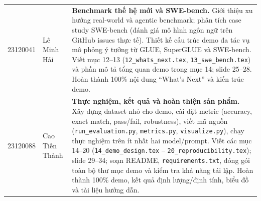 \begin{longtable}{p{2.2cm} p{3.6cm} p{10.2cm}}
23120041 & Lê Minh Hải &
\textbf{Benchmark thế hệ mới và SWE-bench.}
Giới thiệu xu hướng real‑world và agentic benchmark; phân tích case study SWE-bench (đánh giá mô hình ngôn ngữ trên GitHub issues thực tế).
Thiết kế cấu trúc demo đa tác vụ mô phỏng ý tưởng từ GLUE, SuperGLUE và SWE-bench.
Viết mục 12--13 (\texttt{12\_whats\_next.tex}, \texttt{13\_swe\_bench.tex}) và phần mô tả tổng quan demo trong mục 14; slide 25--28.
Hoàn thành 100\% nội dung “What’s Next” và kiến trúc demo. \\
\addlinespace

23120088 & Cao Tiến Thành &
\textbf{Thực nghiệm, kết quả và hoàn thiện sản phẩm.}
Xây dựng dataset nhỏ cho demo, cài đặt metric (accuracy, exact match, pass/fail, robustness), viết mã nguồn (\texttt{run\_evaluation.py}, \texttt{metrics.py}, \texttt{visualize.py}), chạy thực nghiệm trên ít nhất hai model/prompt.
Viết các mục 14--20 (\texttt{14\_demo\_design.tex} -- \texttt{20\_reproducibility.tex}); slide 29--34; soạn README, \texttt{requirements.txt}, đóng gói toàn bộ thư mục demo và kiểm tra khả năng tái lập.
Hoàn thành 100\% demo, kết quả định lượng/định tính, biểu đồ và tài liệu hướng dẫn. \\
\bottomrule

\end{longtable}